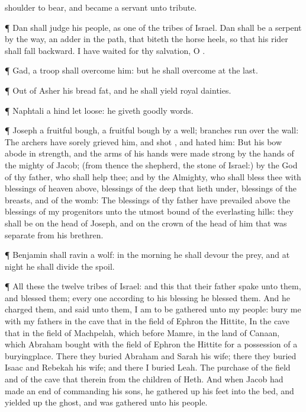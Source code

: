 {shoulder to
bear, and became a
servant unto
tribute.
\par }{\PP {}¶
Dan shall
judge his
people, as
one of the
tribes of
Israel.
Dan shall be a
serpent by the
way, an
adder in the
path, that
biteth the
horse
heels, so that his
rider shall
fall
backward.
I have waited
for thy
salvation, O
{}.
\par }{\PP {}¶
Gad, a
troop shall
overcome him: but he shall
overcome at the
last.
\par }{\PP {}¶ Out of
Asher his
bread
{}
fat, and he shall
yield
royal
dainties.
\par }{\PP {}¶
Naphtali
{} a
hind let
loose: he
giveth
goodly
words.
\par }{\PP {}¶
Joseph
{} a
fruitful
bough,
{} a
fruitful
bough by a
well;
{}
branches
run over the
wall:
The
archers have sorely grieved
him, and
shot
{}, and hated
him:
But his
bow
abode in
strength, and the
arms of his
hands were made
strong by the
hands of the
mighty
{} of
Jacob; (from thence
{} the
shepherd, the
stone of
Israel:)
 by the
God of thy
father, who shall
help thee; and
by the
Almighty, who shall
bless thee with
blessings of
heaven
above,
blessings of the
deep that
lieth under,
blessings of the
breasts, and of the
womb:
The
blessings of thy
father have
prevailed above the
blessings of my
progenitors unto the utmost
bound of the
everlasting
hills: they shall be on the
head of
Joseph, and on the crown of the
head of him that was
separate from his
brethren.
\par }{\PP {}¶
Benjamin shall
ravin
{} a
wolf: in the
morning he shall
devour the
prey, and at
night he shall
divide the
spoil.
\par }{\PP {}¶ All these
{} the
twelve
tribes of
Israel: and this
{} that their
father
spake unto them, and
blessed them;
every
one according to his
blessing he
blessed them.
And he
charged them, and
said unto them, I am to be
gathered unto my
people:
bury me with my
fathers in the
cave that
{} in the
field of
Ephron the
Hittite,
In the
cave that
{} in the
field of
Machpelah, which
{}
before
Mamre, in the
land of
Canaan, which
Abraham
bought with the
field of
Ephron the
Hittite for a
possession of a
buryingplace.
There they
buried
Abraham and
Sarah his
wife; there they
buried
Isaac and
Rebekah his
wife; and there I
buried
Leah.
The
purchase of the
field and of the
cave that
{} therein
{} from the
children of
Heth.
And when
Jacob had made an
end of
commanding his
sons, he gathered
up his
feet into the
bed, and yielded up the
ghost, and was
gathered unto his
people.

}

